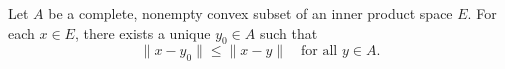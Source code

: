 Let $A$ be a complete, nonempty convex subset of an inner product space $E$. For each $x \in E$, there exists a unique $y_0 \in A$ such that
$$\|x - y_0\| \leq \|x - y\| \quad \text{for all } y \in A.$$
